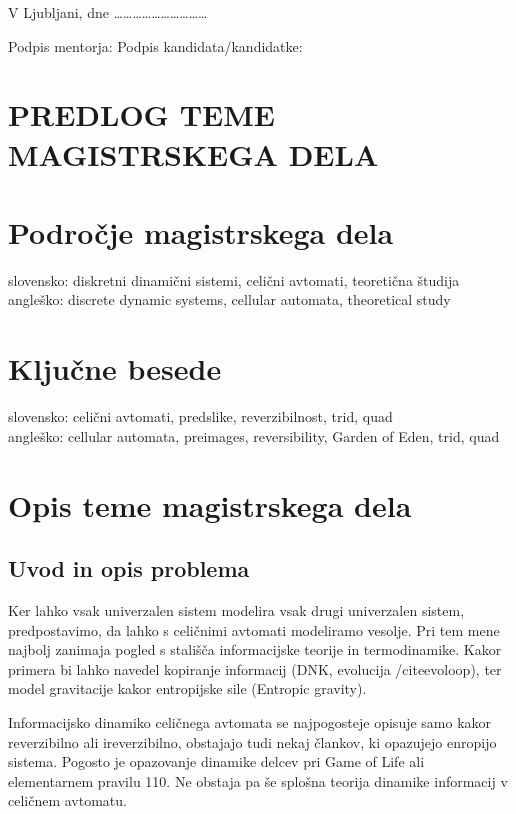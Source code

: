 \documentclass[a4paper, 12pt]{article}
\begin{document}
\bigskip

V Ljubljani, dne …………………………

Podpis mentorja: \hspace{180px} Podpis kandidata/kandidatke:




\clearpage
\section*{PREDLOG TEME MAGISTRSKEGA DELA}

\section{Področje magistrskega dela}

slovensko: diskretni dinamični sistemi, celični avtomati, teoretična študija \\
angleško: discrete dynamic systems, cellular automata, theoretical study


\section{Ključne besede}

slovensko: celični avtomati, predslike, reverzibilnost, trid, quad   \\
angleško: cellular automata, preimages, reversibility, Garden of Eden,  trid, quad


\section{Opis teme magistrskega dela}

\subsection{Uvod in opis problema}

Ker lahko vsak univerzalen sistem modelira vsak drugi univerzalen sistem, predpostavimo,
da lahko s celičnimi avtomati modeliramo vesolje. Pri tem mene najbolj zanimaja pogled s
stališča informacijske teorije in termodinamike. Kakor primera bi lahko navedel kopiranje informacij
(DNK, evolucija /cite{evoloop}), ter model gravitacije kakor entropijske sile (Entropic gravity).

Informacijsko dinamiko celičnega avtomata se najpogosteje opisuje samo kakor reverzibilno ali ireverzibilno,
obstajajo tudi nekaj člankov, ki opazujejo enropijo sistema.
Pogosto je opazovanje dinamike delcev pri Game of Life ali elementarnem pravilu 110.
Ne obstaja pa še splošna teorija dinamike informacij v celičnem avtomatu.
\end{document}
